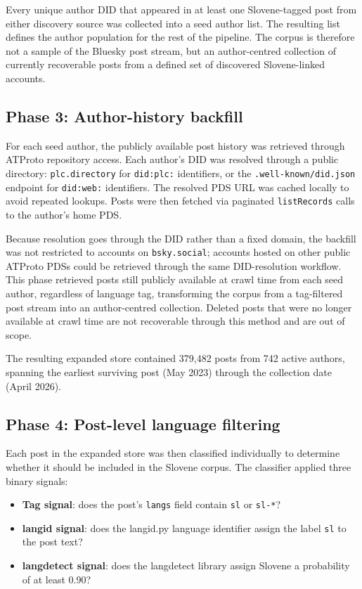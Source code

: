 Every unique author DID that appeared in at least one Slovene-tagged post from either discovery source was collected into a seed author list. The resulting list defines the author population for the rest of the pipeline. The corpus is therefore not a sample of the Bluesky post stream, but an author-centred collection of currently recoverable posts from a defined set of discovered Slovene-linked accounts.

\subsection{Phase 3: Author-history backfill}

For each seed author, the publicly available post history was retrieved through ATProto repository access. Each author's DID was resolved through a public directory: \texttt{plc.directory} for \texttt{did:plc:} identifiers, or the \texttt{.well-known/did.json} endpoint for \texttt{did:web:} identifiers. The resolved PDS URL was cached locally to avoid repeated lookups. Posts were then fetched via paginated \texttt{listRecords} calls to the author's home PDS.

Because resolution goes through the DID rather than a fixed domain, the backfill was not restricted to accounts on \texttt{bsky.social}; accounts hosted on other public ATProto PDSs could be retrieved through the same DID-resolution workflow. This phase retrieved posts still publicly available at crawl time from each seed author, regardless of language tag, transforming the corpus from a tag-filtered post stream into an author-centred collection. Deleted posts that were no longer available at crawl time are not recoverable through this method and are out of scope.

The resulting expanded store contained 379,482 posts from 742 active authors, spanning the earliest surviving post (May 2023) through the collection date (April 2026).

\subsection{Phase 4: Post-level language filtering}

Each post in the expanded store was then classified individually to determine whether it should be included in the Slovene corpus. The classifier applied three binary signals:

\begin{itemize}
  \renewcommand\labelitemi{\textendash} %
  \item \textbf{Tag signal}: does the post's \texttt{langs} field contain \texttt{sl} or \texttt{sl-*}?
  \item \textbf{langid signal}: does the langid.py language identifier \parencite{lui2012langid} assign the label \texttt{sl} to the post text?
  \item \textbf{langdetect signal}: does the langdetect library \parencite{nakatani2010langdetect} assign Slovene a probability of at least 0.90?
\end{itemize}


